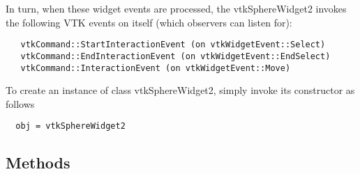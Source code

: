  In turn, when these widget events are processed, the vtkSphereWidget2
 invokes the following VTK events on itself (which observers can listen for):
 \begin{verbatim}
   vtkCommand::StartInteractionEvent (on vtkWidgetEvent::Select)
   vtkCommand::EndInteractionEvent (on vtkWidgetEvent::EndSelect)
   vtkCommand::InteractionEvent (on vtkWidgetEvent::Move)
 \end{verbatim}

To create an instance of class vtkSphereWidget2, simply
invoke its constructor as follows
\begin{verbatim}
  obj = vtkSphereWidget2
\end{verbatim}
\subsection{Methods}

